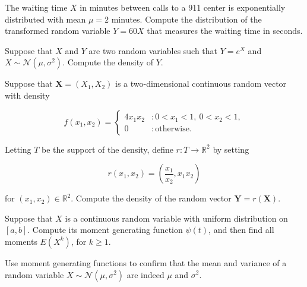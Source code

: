 \documentclass[12pt,reqno]{amsart}
\begin{document}
\vfill
\prob The waiting time $X$ in minutes between calls to a 911 center is exponentially distributed with mean $\mu = 2$ minutes. Compute the distribution of the transformed random variable $Y=60X$ that measures the waiting time in seconds.













\vfill
\newpage
\prob Suppose that $X$ and $Y$ are two random variables such that $Y=e^X$ and $X\sim \mathcal{N}(\mu,\sigma^2)$. Compute the density of $Y$.











\vfill
\prob Suppose that $\mathbf{X}=(X_1,X_2)$ is a two-dimensional continuous random vector with density

	\[
	f(x_1,x_2) = \begin{cases}
	4x_1x_2 & : 0 < x_1 < 1, \ 0 < x_2 < 1, \\
	0 & : \text{otherwise}.
	\end{cases}
	\]

Letting $T$ be the support of the density, define $r:T \to \mathbb{R}^2$ by setting

	\[r(x_1,x_2) = \left( \frac{x_1}{x_2}, x_1x_2 \right)
	\]
	
for $(x_1,x_2)\in \mathbb{R}^2$. Compute the density of the random vector $\mathbf{Y} = r(\mathbf{X})$.











\vfill
\newpage
\prob Suppose that $X$ is a continuous random variable with uniform distribution on $[a,b]$. Compute its moment generating function $\psi(t)$, and then find all moments $E(X^k)$, for $k\geq 1$.











\vfill
\prob Use moment generating functions to confirm that the mean and variance of a random variable $X \sim \mathcal{N}(\mu,\sigma^2)$ are indeed $\mu$ and $\sigma^2$.
\end{document}
